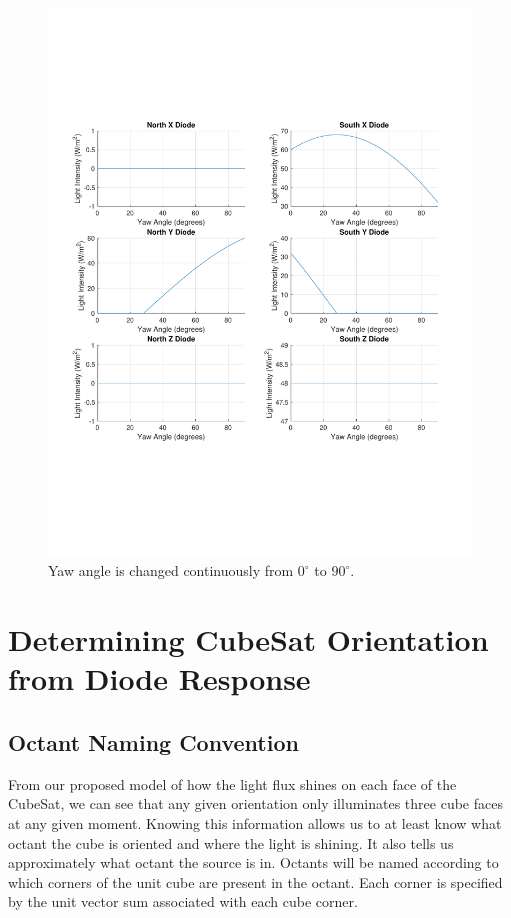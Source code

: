\documentclass[10pt, letterpaper]{article}
\begin{document}
\begin{figure}[H]
	\centering
	\includegraphics[scale=0.8]{YawAngle_DiodeResponse.pdf}
    \caption{Yaw angle is changed continuously from $0^{\circ}$ to $90^{\circ}$.}
    \label{fig:YawAngleChange}
\end{figure}


\section{Determining CubeSat Orientation from Diode Response}

\subsection{Octant Naming Convention}
From our proposed model of how the light flux shines on each face of the CubeSat, we can see that any given orientation only illuminates three cube faces at any given moment. Knowing this information allows us to at least know what octant the cube is oriented and where the light is shining. It also tells us approximately what octant the source is in. Octants will be named according to which corners of the unit cube are present in the octant. Each corner is specified by the unit vector sum associated with each cube corner.
\end{document}
